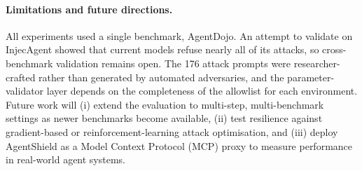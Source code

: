 \documentclass[preprint,12pt]{elsarticle}
\begin{document}
\paragraph{Limitations and future directions.}
All experiments used a single benchmark, AgentDojo. An attempt to validate on InjecAgent showed that current models refuse nearly all of its attacks, so cross-benchmark validation remains open. The 176 attack prompts were researcher-crafted rather than generated by automated adversaries, and the parameter-validator layer depends on the completeness of the allowlist for each environment. Future work will (i) extend the evaluation to multi-step, multi-benchmark settings as newer benchmarks become available, (ii) test resilience against gradient-based or reinforcement-learning attack optimisation, and (iii) deploy AgentShield as a Model Context Protocol (MCP) proxy to measure performance in real-world agent systems.




\end{document}
